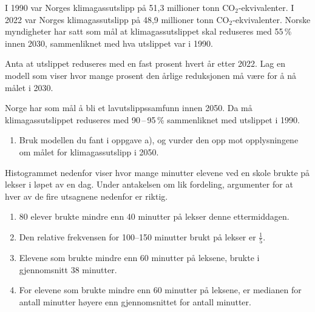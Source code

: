 I 1990 var Norges klimagassutslipp på 51,3 millioner tonn CO$_2$-ekvivalenter.
I 2022 var Norges klimagassutslipp på 48,9 millioner tonn CO$_2$-ekvivalenter.
Norske myndigheter har satt som mål at klimagassutslippet skal reduseres med
55\,\% innen 2030, sammenliknet med hva utslippet var i 1990. \os

Anta at utslippet reduseres med en fast prosent hvert år etter 2022. Lag en modell som viser hvor mange prosent den årlige reduksjonen må være for å nå målet i 2030.



Norge har som mål å bli et lavutslippssamfunn innen 2050. Da må
klimagassutslippet reduseres med 90\,--\,95\,\% sammenliknet med utslippet i 1990.

\begin{enumerate}
	\item[b)] Bruk modellen du fant i oppgave a), og vurder den opp mot
	opplysningene om målet for klimagassutslipp i 2050.
\end{enumerate}

Histogrammet nedenfor viser hvor mange minutter elevene ved en skole brukte på lekser i løpet av en dag.
Under antakelsen om lik fordeling, argumenter for at hver av de fire utsagnene nedenfor er riktig.
\begin{enumerate}
	\item
	80 elever brukte mindre enn 40 minutter på lekser denne ettermiddagen.
	\item
	Den relative frekvensen for 100–150 minutter brukt på lekser er $\frac{1}{5}$.
	\item
	Elevene som brukte mindre enn 60 minutter på leksene,
	brukte i gjennomsnitt 38 minutter.
	\item
	For elevene som brukte mindre enn 60 minutter på leksene, er medianen for antall
	minutter høyere enn gjennomsnittet for antall minutter.
\end{enumerate}

